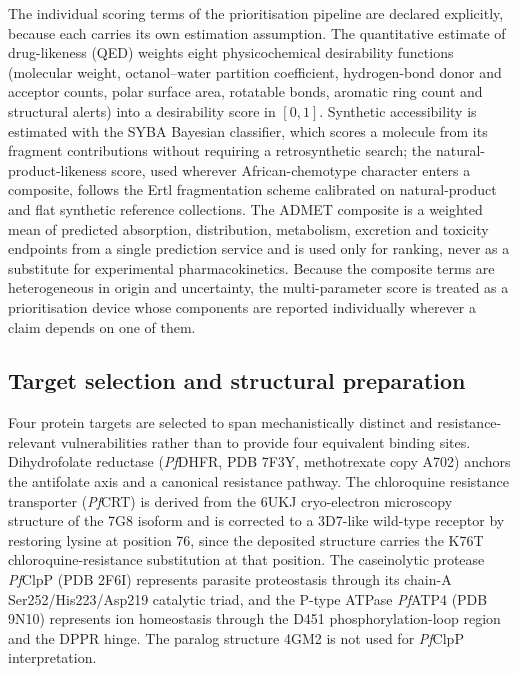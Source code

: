 The individual scoring terms of the prioritisation pipeline are declared explicitly, because each carries its own estimation assumption. The quantitative estimate of drug-likeness (QED) weights eight physicochemical desirability functions (molecular weight, octanol--water partition coefficient, hydrogen-bond donor and acceptor counts, polar surface area, rotatable bonds, aromatic ring count and structural alerts) into a desirability score in $[0, 1]$\cite{Bickerton2012}. Synthetic accessibility is estimated with the SYBA Bayesian classifier, which scores a molecule from its fragment contributions without requiring a retrosynthetic search\cite{Sicho2020}; the natural-product-likeness score, used wherever African-chemotype character enters a composite, follows the Ertl fragmentation scheme calibrated on natural-product and flat synthetic reference collections\cite{Ertl2008}. The ADMET composite is a weighted mean of predicted absorption, distribution, metabolism, excretion and toxicity endpoints from a single prediction service and is used only for ranking, never as a substitute for experimental pharmacokinetics. Because the composite terms are heterogeneous in origin and uncertainty, the multi-parameter score is treated as a prioritisation device whose components are reported individually wherever a claim depends on one of them.

\subsection{Target selection and structural preparation}\label{sec:target_selection}

Four protein targets are selected to span mechanistically distinct and resistance-relevant vulnerabilities rather than to provide four equivalent binding sites. Dihydrofolate reductase (\emph{Pf}DHFR, PDB 7F3Y, methotrexate copy A702) anchors the antifolate axis and a canonical resistance pathway. The chloroquine resistance transporter (\emph{Pf}CRT) is derived from the 6UKJ cryo-electron microscopy structure of the 7G8 isoform and is corrected to a 3D7-like wild-type receptor by restoring lysine at position \num{76}, since the deposited structure carries the K76T chloroquine-resistance substitution at that position. The caseinolytic protease \emph{Pf}ClpP (PDB 2F6I) represents parasite proteostasis through its chain-A Ser252/His223/Asp219 catalytic triad, and the P-type ATPase \emph{Pf}ATP4 (PDB 9N10) represents ion homeostasis through the D451 phosphorylation-loop region and the DPPR hinge. The paralog structure 4GM2 is not used for \emph{Pf}ClpP interpretation.

